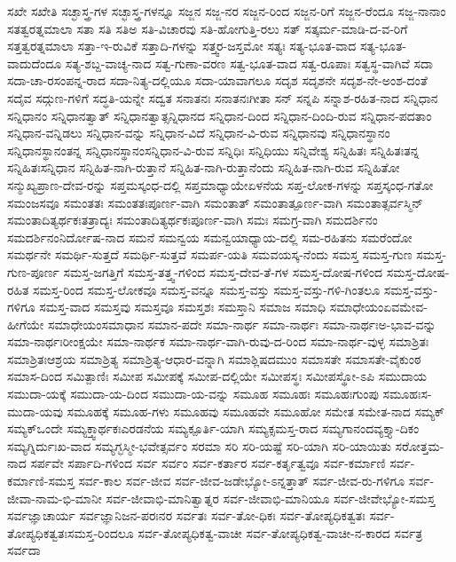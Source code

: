 {ಸಖೇ
ಸಖೇತಿ
ಸಚ್ಛಾಸ್ತ್ರ-ಗಳ
ಸಚ್ಛಾಸ್ತ್ರ-ಗಳನ್ನೂ
ಸಜ್ಜನ
ಸಜ್ಜ-ನರ
ಸಜ್ಜನ-ರಿಂದ
ಸಜ್ಜನ-ರಿಗೆ
ಸಜ್ಜನ-ರೆಂದೂ
ಸಜ್ಜ-ನಾನಾಂ
ಸತತ್ವರತ್ನಮಾಲಾ
ಸತಾ
ಸತಿ
ಸತಿಅ
ಸತಿ-ವಿಚಾರವು
ಸತಿ-ಹೋಗುತ್ತಿ-ರಲು
ಸತ್
ಸತ್ಕರ್ಮ-ಮಾಡಿ-ದ-ವ-ರಿಗೆ
ಸತ್ತತ್ವರತ್ನಮಾಲಾ
ಸತ್ತಾ-ಇ-ರುವಿಕೆ
ಸತ್ತಾದಿ-ಗಳನ್ನು
ಸತ್ತ್ವರ-ಜಸ್ತಮೋ
ಸತ್ಯಃ
ಸತ್ಯ-ಭೂತ-ವಾದ
ಸತ್ಯ-ಭೂತ-ವಾದುದೆಂದೂ
ಸತ್ಯ-ಶಬ್ದ-ವಾಚ್ಯ-ನಾದ
ಸತ್ವ-ಗುಣಾ-ವರಣ
ಸತ್ವ-ಭೂತ-ವಾದ
ಸತ್ವ-ರೂಪಾಃ
ಸತ್ವಸ್ಥ-ವಾಗಿವೆ
ಸದಾ
ಸದಾ-ಚಾ-ರಸಂಪನ್ನ-ರಾದ
ಸದಾ-ನಿತ್ಯ-ದಲ್ಲಿಯೂ
ಸದಾ-ಯಾವಾಗಲೂ
ಸದೃಶ
ಸದೃಶನೇ
ಸದೃಶ-ನೇ-ಅಂಶ-ದಂತೆ
ಸದೈವ
ಸದ್ಗುಣ-ಗಳಿಗೆ
ಸದ್ಧತಿ-ಯನ್ನೇ
ಸದ್ವತ
ಸನಾತನಃ
ಸನಾತನಃಗೀತಾ
ಸನ್
ಸನ್ನಪಿ
ಸನ್ನಾಶ-ರಹಿತ-ನಾದ
ಸನ್ನಿಧಾನ
ಸನ್ನಿಧಾನಂ
ಸನ್ನಿಧಾನತ್ವಾತ್
ಸನ್ನಿಧಾನತ್ವಾತ್ಸನ್ನಿಧಾನದ
ಸನ್ನಿಧಾನ-ದಿಂದ
ಸನ್ನಿಧಾನ-ದಿಂದಿ-ರುವ
ಸನ್ನಿಧಾನ-ಪದತಾಂ
ಸನ್ನಿಧಾನ-ವನ್ನಿಡಲು
ಸನ್ನಿಧಾನ-ವನ್ನು
ಸನ್ನಿಧಾನ-ವಿದೆ
ಸನ್ನಿಧಾನ-ವಿ-ರುವ
ಸನ್ನಿಧಾನವು
ಸನ್ನಿಧಾನಸ್ಥಾನಂ
ಸನ್ನಿಧಾನಸ್ಥಾನಂತನ್ನ
ಸನ್ನಿಧಾನಸ್ಥಾನಂಸನ್ನಿಧಾನ-ವಿ-ರುವ
ಸನ್ನಿಧಿಃ
ಸನ್ನಿಧಿಯು
ಸನ್ನಿವೇಶ್ಯ
ಸನ್ನಿಹಿತಃ
ಸನ್ನಿಹಿತಃತನ್ನ
ಸನ್ನಿಹಿತಃಸನ್ನಿಧಾನ
ಸನ್ನಿಹಿತ-ನಾಗಿ-ರುತ್ತಾನೆ
ಸನ್ನಿಹಿತ-ನಾಗಿ-ರುತ್ತಾನೆಂದು
ಸನ್ನಿಹಿತ-ನಾಗಿ-ರುವ
ಸನ್ನಿಹಿತೋ
ಸನ್ಮುಖ್ಯಪ್ರಾಣ-ದೇವ-ರನ್ನು
ಸಪ್ತಮಸ್ಕಂಧ-ದಲ್ಲಿ
ಸಪ್ತಮಾಧ್ಯಾಯೇಏಳನೆಯ
ಸಪ್ತ-ಲೋಕ-ಗಳನ್ನು
ಸಪ್ತಸ್ಕಂಧ-ಗತೋ
ಸಮಂಜಸವೂ
ಸಮಂತತಃ
ಸಮಂತತಃಪೂರ್ಣ-ವಾಗಿ
ಸಮಂತಾತ್
ಸಮಂತಾತ್ಪೂರ್ಣ-ವಾಗಿ
ಸಮಂತಾತ್ಸರ್ವಸ್ಮಿನ್
ಸಮಂತಾದಿತ್ಯರ್ಥಕಃತತ್ರಾದ್ಯಃ
ಸಮಂತಾದಿತ್ಯರ್ಥಕಃಪೂರ್ಣ-ವಾಗಿ
ಸಮಃ
ಸಮಗ್ರ-ವಾಗಿ
ಸಮದರ್ಶಿನಂ
ಸಮದರ್ಶಿನಂನಿರ್ದೋಷ-ನಾದ
ಸಮನೆ
ಸಮನ್ವಯ
ಸಮನ್ವಯಾಧ್ಯಾಯ-ದಲ್ಲಿ
ಸಮ-ರಹಿತನು
ಸಮರೆಂದೋ
ಸಮರ್ಥನೇ
ಸಮರ್ಥಿ-ಸುತ್ತದೆ
ಸಮರ್ಥಿ-ಸುತ್ತವೆ
ಸಮರ್ಪ-ಯತಿ
ಸಮವಯಸ್ಕ-ನೆಂದು
ಸಮಸ್ತ
ಸಮಸ್ತ-ಗುಣ
ಸಮಸ್ತ-ಗುಣ-ಪೂರ್ಣ
ಸಮಸ್ತ-ಜಗತ್ತಿಗೆ
ಸಮಸ್ತ-ತತ್ತ್ವ-ಗಳಿಂದ
ಸಮಸ್ತ-ದೇವ-ತೆ-ಗಳ
ಸಮಸ್ತ-ದೋಷ-ಗಳಿಂದ
ಸಮಸ್ತ-ದೋಷ-ರಹಿತ
ಸಮಸ್ತ-ರಿಂದ
ಸಮಸ್ತ-ಲೋಕವೂ
ಸಮಸ್ತ-ವನ್ನೂ
ಸಮಸ್ತ-ವಸ್ತು
ಸಮಸ್ತ-ವಸ್ತು-ಗಳಿ-ಗಿಂತಲೂ
ಸಮಸ್ತ-ವಸ್ತು-ಗಳಿಗೂ
ಸಮಸ್ತ-ವಾದ
ಸಮಸ್ತವು
ಸಮಸ್ತವೂ
ಸಮಸ್ತಶಃ
ಸಮಸ್ತಾನಿ
ಸಮಾಜ
ಸಮಾಧಿ
ಸಮಾಧೇಯಂಏವಮೇವ-ಹೀಗೆಯೇ
ಸಮಾಧೇಯಂಸಮಾಧಾನ
ಸಮಾನ-ಪದೇ
ಸಮಾ-ನಾರ್ಥ
ಸಮಾ-ನಾರ್ಥಃ
ಸಮಾ-ನಾರ್ಥಃಅ-ಭಾವ-ವನ್ನು
ಸಮಾ-ನಾರ್ಥಃರೀಂಕ್ಷಯೇ
ಸಮಾ-ನಾರ್ಥಕ
ಸಮಾ-ನಾರ್ಥ-ವಾಗಿ-ರುವು-ದ-ರಿಂದ
ಸಮಾ-ನಾರ್ಥ-ವುಳ್ಳ
ಸಮಾಶ್ರಿತಃ
ಸಮಾಶ್ರಿತಃಆಶ್ರಯ
ಸಮಾಶ್ರಿತ್ಯ
ಸಮಾಶ್ರಿತ್ಯ-ಆಧಾರ-ವನ್ನಾಗಿ
ಸಮಾಶ್ಲಿಷದಮುಂ
ಸಮಾಸತೇ
ಸಮಾಸತೇ-ವೈಕುಂಠ
ಸಮಾಸ-ದಿಂದ
ಸಮಿತ್ಪಾಣಿಃ
ಸಮೀಪ
ಸಮೀಪಕ್ಕೆ
ಸಮೀಪ-ದಲ್ಲಿಯೇ
ಸಮೀಪಸ್ಥಃ
ಸಮೀಪಸ್ಥೋ-ಽಪಿ
ಸಮುದಾಯ
ಸಮುದಾ-ಯಕ್ಕೆ
ಸಮುದಾ-ಯ-ದಿಂದ
ಸಮುದಾ-ಯ-ವನ್ನು
ಸಮೂಹ
ಸಮೂಹಃ
ಸಮೂಹಃಗುಂಪು
ಸಮೂಹಃಸ-ಮುದಾ-ಯವು
ಸಮೂಹಕ್ಕೆ
ಸಮೂಹ-ಗಳು
ಸಮೂಹವು
ಸಮೂಹವೇ
ಸಮೂಹೋ
ಸಮೇತ
ಸಮೇತ-ನಾದ
ಸಮ್ಯಕ್
ಸಮ್ಯಕ್ಒಂದೇ
ಸಮ್ಯಕ್ತ್ವಾರ್ಥಕಃಎರಡನೆಯ
ಸಮ್ಯಕ್ಪೂರ್ತಿ-ಯಾಗಿ
ಸಮ್ಯಕ್ಸಮಸ್ತ-ರಾದ
ಸಮ್ಯಗಾನಂದವ್ಯಕ್ತ್ಯಾ-ದಿಕಂ
ಸಮ್ಯಗ್ನಿರ್ದುಃಖ-ವಾದ
ಸಮ್ಯಗ್ಭಸ್ಮೀ-ಭವೇತ್ಸರ್ವಂ
ಸರಮಾ
ಸರಿ
ಸರಿ-ಯಷ್ಟೆ
ಸರಿ-ಯಾಗಿ
ಸರಿ-ಯಾಯಿತು
ಸರೋತ್ತಮ-ನಾದ
ಸರ್ಪವೇ
ಸರ್ಪಾದಿ-ಗಳಿಂದ
ಸರ್ವ
ಸರ್ವಂ
ಸರ್ವ-ಕರ್ತಾರ
ಸರ್ವ-ಕರ್ತೃತ್ವವೂ
ಸರ್ವ-ಕರ್ಮಾಣಿ
ಸರ್ವ-ಕರ್ಮಾಣಿ-ಸಮಸ್ತ
ಸರ್ವ-ಕಾಲ
ಸರ್ವ-ಜೀವ
ಸರ್ವ-ಜೀವ-ಜಡೇಭ್ಯೋ-ಽನ್ನತ್ತಾತ್
ಸರ್ವ-ಜೀವ-ರು-ಗಳಿಗೂ
ಸರ್ವ-ಜೀವಾ-ನಾಮ-ಭಿ-ಮಾನೀ
ಸರ್ವ-ಜೀವಾಭಿ-ಮಾನಿತ್ವಾತ್ನರ
ಸರ್ವ-ಜೀವಾಭಿ-ಮಾನಿಯೂ
ಸರ್ವ-ಜೀವೇಭ್ಯೋ-ಸಮಸ್ತ
ಸರ್ವಜ್ಞಾಚಾರ್ಯ
ಸರ್ವಜ್ಞಾನಿಜನ-ಪರಃನರ
ಸರ್ವತಃ
ಸರ್ವ-ತೋ-ಧಿಕಃ
ಸರ್ವ-ತೋಪ್ಯಧಿಕತ್ವತಃ
ಸರ್ವ-ತೋಪ್ಯಧಿಕತ್ವತಃಸಮಸ್ತ-ರಿಂದಲೂ
ಸರ್ವ-ತೋಪ್ಯಧಿಕತ್ವ-ವಾಚೀ
ಸರ್ವ-ತೋಪ್ಯಧಿಕತ್ವ-ವಾಚೀ-ನ-ಕಾರದ
ಸರ್ವತ್ರ
ಸರ್ವದಾ
}
